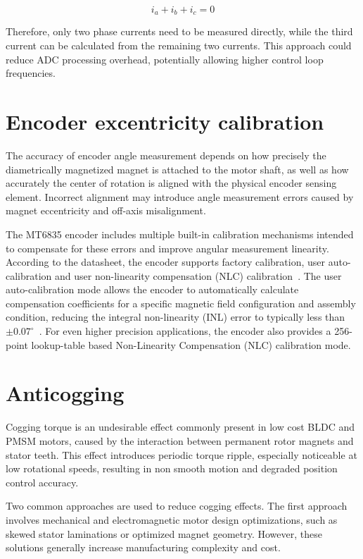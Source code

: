 \begin{equation}
    i_a + i_b + i_c = 0 
\end{equation}

Therefore, only two phase currents need to be measured directly, while the third current can be calculated from the remaining two currents. \cite{kirchhoff}
This approach could reduce ADC processing overhead, potentially allowing higher control loop frequencies.


\section{Encoder excentricity calibration}
The accuracy of encoder angle measurement depends on how precisely the diametrically magnetized magnet is attached to the motor shaft,
as well as how accurately the center of rotation is aligned with the physical encoder sensing element.
Incorrect alignment may introduce angle measurement errors caused by magnet eccentricity and off-axis misalignment.

The MT6835 encoder includes multiple built-in calibration mechanisms intended to compensate for these errors and improve angular measurement linearity.
According to the datasheet, the encoder supports factory calibration, user auto-calibration and user non-linearity compensation (NLC) calibration~\cite{datasheet_MT6835}. 
The user auto-calibration mode allows the encoder to automatically calculate compensation coefficients for a specific magnetic field configuration and assembly condition,
reducing the integral non-linearity (INL) error to typically less than $\pm0.07^\circ$~\cite{datasheet_MT6835}. 
For even higher precision applications, the encoder also provides a 256-point lookup-table based Non-Linearity Compensation (NLC) calibration mode.

\section{Anticogging}
Cogging torque is an undesirable effect commonly present in low cost BLDC and PMSM motors, caused by the interaction between permanent rotor magnets and stator teeth.
This effect introduces periodic torque ripple, especially noticeable at low rotational speeds, resulting in non smooth motion and degraded position control accuracy.

Two common approaches are used to reduce cogging effects.
The first approach involves mechanical and electromagnetic motor design optimizations, such as skewed stator laminations or optimized magnet geometry.
However, these solutions generally increase manufacturing complexity and cost.

